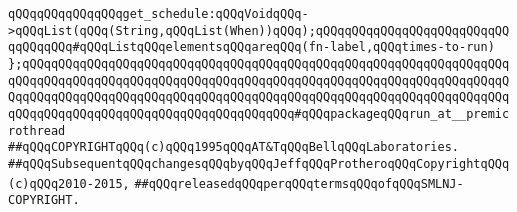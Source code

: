 \newline
\verb|qQQqqQQqqQQqqQQqget_schedule:qQQqVoidqQQq->qQQqList(qQQq(String,qQQqList(When))qQQq);qQQqqQQqqQQqqQQqqQQqqQQqqQQqqQQqqQQq#qQQqListqQQqelementsqQQqareqQQq(fn-label,qQQqtimes-to-run)|\newline
\verb|};qQQqqQQqqQQqqQQqqQQqqQQqqQQqqQQqqQQqqQQqqQQqqQQqqQQqqQQqqQQqqQQqqQQqqQQqqQQqqQQqqQQqqQQqqQQqqQQqqQQqqQQqqQQqqQQqqQQqqQQqqQQqqQQqqQQqqQQqqQQqqQQqqQQqqQQqqQQqqQQqqQQqqQQqqQQqqQQqqQQqqQQqqQQqqQQqqQQqqQQqqQQqqQQqqQQqqQQqqQQqqQQqqQQqqQQqqQQqqQQqqQQqqQQq#qQQqpackageqQQqrun_at__premicrothread|\newline
\newline
\newline
\newline
\newline
\verb|##qQQqCOPYRIGHTqQQq(c)qQQq1995qQQqAT&TqQQqBellqQQqLaboratories.|\newline
\verb|##qQQqSubsequentqQQqchangesqQQqbyqQQqJeffqQQqProtheroqQQqCopyrightqQQq(c)qQQq2010-2015,|\newline
\verb|##qQQqreleasedqQQqperqQQqtermsqQQqofqQQqSMLNJ-COPYRIGHT.|\newline

